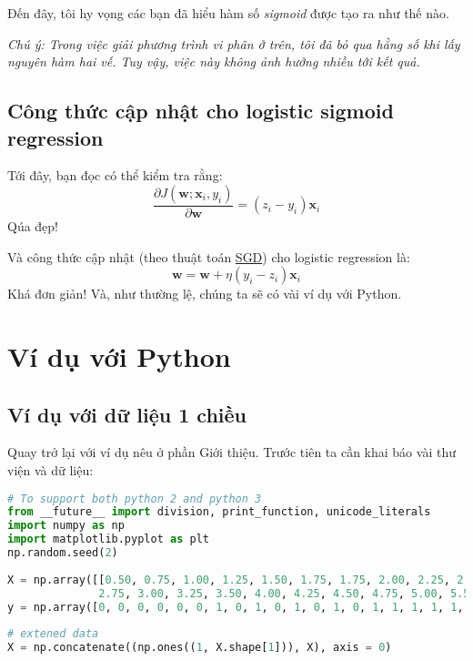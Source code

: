 Đến đây, tôi hy vọng các bạn đã hiểu hàm số \textit{sigmoid} được tạo ra như thế nào. 
 
\textit{Chú ý: Trong việc giải phương trình vi phân ở trên, tôi đã bỏ qua hằng số khi lấy nguyên hàm hai vế. Tuy vậy, việc này không ảnh hưởng nhiều tới kết quả.} 
 
 
\subsection{Công thức cập nhật cho logistic sigmoid regression}
Tới đây, bạn đọc có thể kiểm tra rằng: 
\begin{equation*} 
\frac{\partial J(\mathbf{w}; \mathbf{x}_i, y_i)}{\partial \mathbf{w}} = (z_i - y_i)\mathbf{x}_i 
\end{equation*} 
Qúa đẹp! 
 
Và công thức cập nhật (theo thuật toán \href{http://machinelearningcoban.com/2017/01/16/gradientdescent2/#-stochastic-gradient-descent}{SGD}) cho logistic regression là:  
\begin{equation*} 
\mathbf{w} = \mathbf{w} + \eta(y_i - z_i)\mathbf{x}_i 
\end{equation*} 
Khá đơn giản! Và, như thường lệ, chúng ta sẽ có vài ví dụ với Python. 
 
 
\section{Ví dụ với Python}
 
 
\subsection{Ví dụ với dữ liệu 1 chiều}
 
Quay trở lại với ví dụ nêu ở phần Giới thiệu. Trước tiên ta cần khai báo vài thư viện và dữ liệu: 
 
 
\begin{lstlisting}[language=Python]
# To support both python 2 and python 3 
from __future__ import division, print_function, unicode_literals 
import numpy as np  
import matplotlib.pyplot as plt 
np.random.seed(2) 
 
X = np.array([[0.50, 0.75, 1.00, 1.25, 1.50, 1.75, 1.75, 2.00, 2.25, 2.50,  
              2.75, 3.00, 3.25, 3.50, 4.00, 4.25, 4.50, 4.75, 5.00, 5.50]]) 
y = np.array([0, 0, 0, 0, 0, 0, 1, 0, 1, 0, 1, 0, 1, 0, 1, 1, 1, 1, 1, 1]) 
 
# extened data  
X = np.concatenate((np.ones((1, X.shape[1])), X), axis = 0) 
\end{lstlisting}
 

